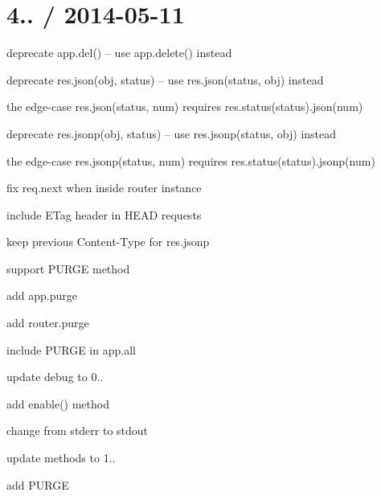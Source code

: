 {\ttfamily \section*{4.. / 2014-\/05-\/11 }}

{\ttfamily }

{\ttfamily 
\begin{DoxyItemize}
\item deprecate {\ttfamily app.\+del()} -- use {\ttfamily app.\+delete()} instead
\item deprecate {\ttfamily res.\+json(obj, status)} -- use {\ttfamily res.\+json(status, obj)} instead
\begin{DoxyItemize}
\item the edge-\/case {\ttfamily res.\+json(status, num)} requires {\ttfamily res.\+status(status).json(num)}
\end{DoxyItemize}
\item deprecate {\ttfamily res.\+jsonp(obj, status)} -- use {\ttfamily res.\+jsonp(status, obj)} instead
\begin{DoxyItemize}
\item the edge-\/case {\ttfamily res.\+jsonp(status, num)} requires {\ttfamily res.\+status(status).jsonp(num)}
\end{DoxyItemize}
\item fix {\ttfamily req.\+next} when inside router instance
\item include {\ttfamily E\+Tag} header in {\ttfamily H\+E\+AD} requests
\item keep previous {\ttfamily Content-\/\+Type} for {\ttfamily res.\+jsonp}
\item support P\+U\+R\+GE method
\begin{DoxyItemize}
\item add {\ttfamily app.\+purge}
\item add {\ttfamily router.\+purge}
\item include P\+U\+R\+GE in {\ttfamily app.\+all}
\end{DoxyItemize}
\item update debug to 0..
\begin{DoxyItemize}
\item add {\ttfamily enable()} method
\item change from stderr to stdout
\end{DoxyItemize}
\item update methods to 1..
\begin{DoxyItemize}
\item add P\+U\+R\+GE
\end{DoxyItemize}
\end{DoxyItemize}}

